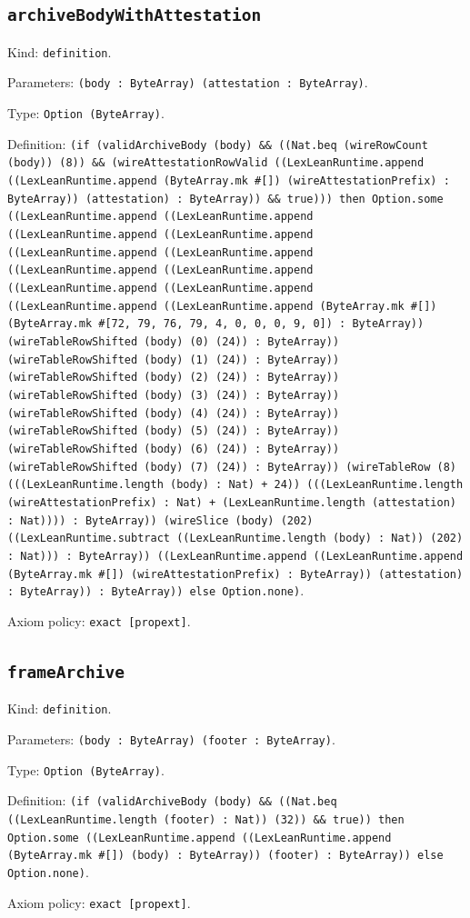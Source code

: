 \documentclass[11pt]{article}
\begin{document}
\subsection*{\texttt{archiveBodyWithAttestation}}
\noindent Kind: \texttt{definition}.\par
\noindent Parameters: \texttt{(body : ByteArray) (attestation : ByteArray)}.\par
\noindent Type: \texttt{Option (ByteArray)}.\par
\noindent Definition: \texttt{(if (validArchiveBody (body) \&\& ((Nat.beq (wireRowCount (body)) (8)) \&\& (wireAttestationRowValid ((LexLeanRuntime.append ((LexLeanRuntime.append (ByteArray.mk \#[]) (wireAttestationPrefix) : ByteArray)) (attestation) : ByteArray)) \&\& true))) then Option.some ((LexLeanRuntime.append ((LexLeanRuntime.append ((LexLeanRuntime.append ((LexLeanRuntime.append ((LexLeanRuntime.append ((LexLeanRuntime.append ((LexLeanRuntime.append ((LexLeanRuntime.append ((LexLeanRuntime.append ((LexLeanRuntime.append ((LexLeanRuntime.append ((LexLeanRuntime.append (ByteArray.mk \#[]) (ByteArray.mk \#[72, 79, 76, 79, 4, 0, 0, 0, 9, 0]) : ByteArray)) (wireTableRowShifted (body) (0) (24)) : ByteArray)) (wireTableRowShifted (body) (1) (24)) : ByteArray)) (wireTableRowShifted (body) (2) (24)) : ByteArray)) (wireTableRowShifted (body) (3) (24)) : ByteArray)) (wireTableRowShifted (body) (4) (24)) : ByteArray)) (wireTableRowShifted (body) (5) (24)) : ByteArray)) (wireTableRowShifted (body) (6) (24)) : ByteArray)) (wireTableRowShifted (body) (7) (24)) : ByteArray)) (wireTableRow (8) (((LexLeanRuntime.length (body) : Nat) + 24)) (((LexLeanRuntime.length (wireAttestationPrefix) : Nat) + (LexLeanRuntime.length (attestation) : Nat)))) : ByteArray)) (wireSlice (body) (202) ((LexLeanRuntime.subtract ((LexLeanRuntime.length (body) : Nat)) (202) : Nat))) : ByteArray)) ((LexLeanRuntime.append ((LexLeanRuntime.append (ByteArray.mk \#[]) (wireAttestationPrefix) : ByteArray)) (attestation) : ByteArray)) : ByteArray)) else Option.none)}.\par
\noindent Axiom policy: \texttt{exact [propext]}.\par
\subsection*{\texttt{frameArchive}}
\noindent Kind: \texttt{definition}.\par
\noindent Parameters: \texttt{(body : ByteArray) (footer : ByteArray)}.\par
\noindent Type: \texttt{Option (ByteArray)}.\par
\noindent Definition: \texttt{(if (validArchiveBody (body) \&\& ((Nat.beq ((LexLeanRuntime.length (footer) : Nat)) (32)) \&\& true)) then Option.some ((LexLeanRuntime.append ((LexLeanRuntime.append (ByteArray.mk \#[]) (body) : ByteArray)) (footer) : ByteArray)) else Option.none)}.\par
\noindent Axiom policy: \texttt{exact [propext]}.\par
\end{document}
